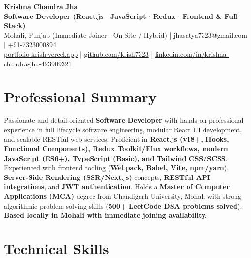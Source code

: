 \documentclass[a4paper,10pt]{article}
\begin{document}
\begin{center}

    {\LARGE \textbf{Krishna Chandra Jha}} \\[2.5pt]

    \textbf{Software Developer (React.js $\cdot$ JavaScript $\cdot$ Redux $\cdot$ Frontend \& Full Stack)} \\[3.5pt]

    Mohali, Punjab (Immediate Joiner $\cdot$ On-Site / Hybrid)
    \quad | \quad
    jhasatya7323@gmail.com
    \quad | \quad
    +91-7323000894
    \\[2.5pt]

    \href{https://portfolio-ashen-alpha-dv0whhsamo.vercel.app/}{portfolio-krish.vercel.app}
    \quad | \quad
    \href{https://github.com/krish7323}{github.com/krish7323}
    \quad | \quad
    \href{https://linkedin.com/in/krishna-chandra-jha-423909321}
    {linkedin.com/in/krishna-chandra-jha-423909321}

\end{center}

\section*{Professional Summary}

Passionate and detail-oriented \textbf{Software Developer} with hands-on professional experience in full lifecycle software engineering, modular React UI development, and scalable RESTful web services. Proficient in \textbf{React.js (v18+, Hooks, Functional Components), Redux Toolkit/Flux workflows, modern JavaScript (ES6+), TypeScript (Basic), and Tailwind CSS/SCSS}. Experienced with frontend tooling (\textbf{Webpack, Babel, Vite, npm/yarn}), \textbf{Server-Side Rendering (SSR/Next.js)} concepts, \textbf{RESTful API integrations}, and \textbf{JWT authentication}. Holds a \textbf{Master of Computer Applications (MCA)} degree from Chandigarh University, Mohali with strong algorithmic problem-solving skills (\textbf{500+ LeetCode DSA problems solved}). \textbf{Based locally in Mohali with immediate joining availability.}

\section*{Technical Skills}
\end{document}
